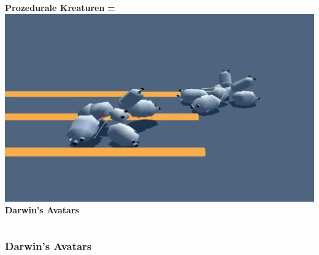 \documentclass{beamer}
\begin{document}
\begin{frame}
\begin{columns}[c]
		\vspace{1.5em}
		\textbf{Prozedurale Kreaturen}
		\centering
		\textbf{\huge =}
		\centering
		\includegraphics[width=\textwidth]{img/games/darwin.png} \\
		\vspace{1.5em}
		\textbf{Darwin's Avatars}
	\end{columns}
	
\end{frame}


\begin{frame}
	\frametitle{Darwin's Avatars}	
\end{frame}

\usebackgroundtemplate{}
\end{document}
